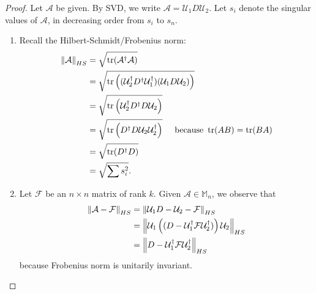 \documentclass{book}
\theoremstyle{definition}
\newcommand{\F}{\mathcal{F}}
\newcommand{\Uni}{\mathcal{U}}
\newcommand{\A}{\mathcal{A}}
\newcommand{\lp}{\left(}
\newcommand{\rp}{\right)}
\begin{document}
\begin{proof}
	Let $\A$ be given. By SVD, we write $\A = \Uni_1 D \Uni_2 $. Let $s_i$ denote the singular values of $\A$, in decreasing order from $s_i$ to $s_n$. 
	\begin{enumerate}
		\item Recall the Hilbert-Schmidt/Frobenius norm:
		\begin{align*}
		\norm{\A}_{HS} &= \sqrt{\tr(\A^\dagger\A)} \\
		&= \sqrt{\tr\lp (\Uni_2^\dagger D^\dagger \Uni_1^\dagger)(\Uni_1 D \Uni_2) \rp} \\ 
		&= \sqrt{\tr\lp \Uni_2^\dagger D^\dagger D \Uni_2 \rp} \\
		&= \sqrt{\tr\lp D^\dagger D \Uni_2 \Uni_2^\dagger\rp} \hspace{0.5cm}\text{because }\tr(AB) = \tr(BA)\\
		&= \sqrt{\tr(D^\dagger D)}\\
		&= \sqrt{\sum s_i^2}.
		\end{align*}
		
		
		
		\item Let $\F$ be an $n\times n$ matrix of rank $k$. Given $\A \in \mathbb{M}_n$, we observe that 
		\begin{align*}
		\norm{\A- \F}_{HS} &= \norm{\Uni_1 D - \Uni_2 - \F}_{HS}\\
		&= \norm{\Uni_1 \lp (D - \Uni_1^\dagger \F \Uni_2^\dagger) \rp \Uni_2}_{HS}\\
		&= \norm{D - \Uni_1^\dagger \F \Uni_2^\dagger}_{HS}
		\end{align*} 
		because Frobenius norm is unitarily invariant. 
		

\end{enumerate}
\end{proof}
\end{document}
